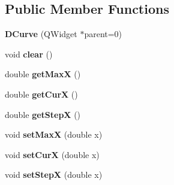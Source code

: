 \subsection*{Public Member Functions}
\begin{DoxyCompactItemize}
\item 
\hypertarget{class_d_curve_a2f9fab43977d614e4e0e351e9f7e1917}{
{\bfseries DCurve} (QWidget $\ast$parent=0)}
\label{class_d_curve_a2f9fab43977d614e4e0e351e9f7e1917}

\item 
\hypertarget{class_d_curve_aeb642f1bae222064624dbb42e0c6eb03}{
void {\bfseries clear} ()}
\label{class_d_curve_aeb642f1bae222064624dbb42e0c6eb03}

\item 
\hypertarget{class_d_curve_a4fa1539a0d8d7dd5adfdb64f46f552c4}{
double {\bfseries getMaxX} ()}
\label{class_d_curve_a4fa1539a0d8d7dd5adfdb64f46f552c4}

\item 
\hypertarget{class_d_curve_a1604006983421bc479efe9e6383ebbf6}{
double {\bfseries getCurX} ()}
\label{class_d_curve_a1604006983421bc479efe9e6383ebbf6}

\item 
\hypertarget{class_d_curve_acf281464b139b0e65920430993c4e477}{
double {\bfseries getStepX} ()}
\label{class_d_curve_acf281464b139b0e65920430993c4e477}

\item 
\hypertarget{class_d_curve_a0c3999c4792840aed8a7979e3808612f}{
void {\bfseries setMaxX} (double x)}
\label{class_d_curve_a0c3999c4792840aed8a7979e3808612f}

\item 
\hypertarget{class_d_curve_a15b492423bc3f3e5bff4da4a6cf6db1b}{
void {\bfseries setCurX} (double x)}
\label{class_d_curve_a15b492423bc3f3e5bff4da4a6cf6db1b}

\item 
\hypertarget{class_d_curve_a8ff7ce13b6c2c132acd0a05c603620e0}{
void {\bfseries setStepX} (double x)}
\label{class_d_curve_a8ff7ce13b6c2c132acd0a05c603620e0}

\end{DoxyCompactItemize}
